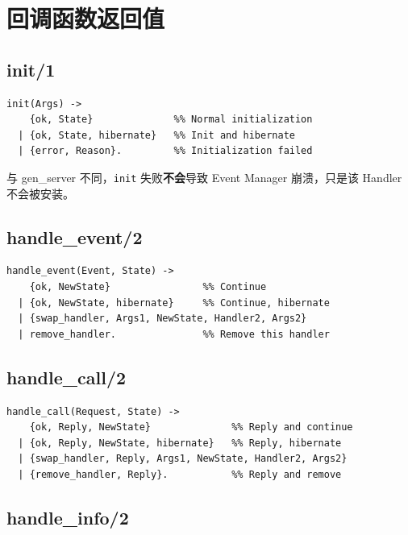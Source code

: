 \documentclass[a4paper,11pt]{article}
\begin{document}
\section{回调函数返回值}

\subsection{init/1}

\begin{lstlisting}[style=erlangstyle]
init(Args) ->
    {ok, State}              %% Normal initialization
  | {ok, State, hibernate}   %% Init and hibernate
  | {error, Reason}.         %% Initialization failed
\end{lstlisting}

\begin{warnbox}[注意]
与 gen\_server 不同，\texttt{init} 失败\textbf{不会}导致 Event Manager 崩溃，只是该 Handler 不会被安装。
\end{warnbox}

\subsection{handle\_event/2}

\begin{lstlisting}[style=erlangstyle]
handle_event(Event, State) ->
    {ok, NewState}                %% Continue
  | {ok, NewState, hibernate}     %% Continue, hibernate
  | {swap_handler, Args1, NewState, Handler2, Args2}
  | remove_handler.               %% Remove this handler
\end{lstlisting}

\subsection{handle\_call/2}

\begin{lstlisting}[style=erlangstyle]
handle_call(Request, State) ->
    {ok, Reply, NewState}              %% Reply and continue
  | {ok, Reply, NewState, hibernate}   %% Reply, hibernate
  | {swap_handler, Reply, Args1, NewState, Handler2, Args2}
  | {remove_handler, Reply}.           %% Reply and remove
\end{lstlisting}

\subsection{handle\_info/2}
\end{document}

